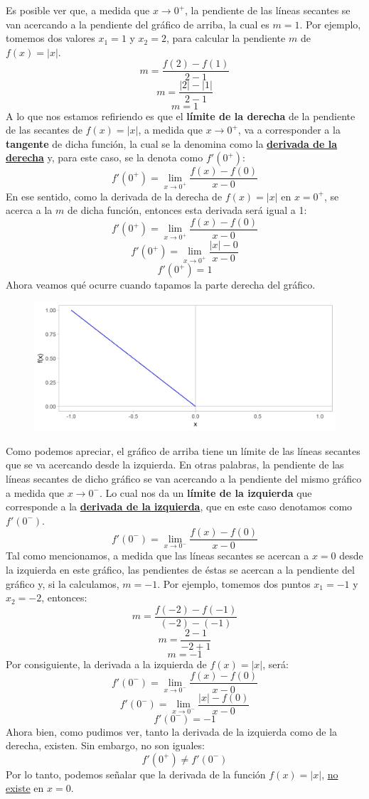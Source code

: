\documentclass[12pt]{article}
\begin{document}
Es posible ver que, a medida que $x \to 0^{+}$, la pendiente de las líneas secantes se van acercando a la pendiente del gráfico de arriba, la cual es $m = 1$. Por ejemplo, tomemos dos valores $x_{1} = 1$ y $x_{2} = 2$, para calcular la pendiente $m$ de $f(x) = |x|$.
\[m = \frac{f(2)-f(1)}{2-1}\]
\[m = \frac{|2|-|1|}{2-1}\]
\[m = 1\]
A lo que nos estamos refiriendo es que el \textbf{límite de la derecha} de la pendiente de las secantes de $f(x) = |x|$, a medida que $x \to 0^{+}$, va a corresponder a la \textbf{tangente} de dicha función, la cual se la denomina como la \textbf{\underline{derivada de la derecha}} y, para este caso, se la denota como $f'(0^{+})$:
\[f'(0^{+}) = \lim_{x \to 0^{+}} \frac{f(x)-f(0)}{x-0}\]
En ese sentido, como la derivada de la derecha de $f(x) = |x|$ en $x = 0^{+}$, se acerca a la $m$ de dicha función, entonces esta derivada será igual a 1:
\[f'(0^{+}) = \lim_{x \to 0^{+}} \frac{f(x)-f(0)}{x-0}\]
\[f'(0^{+}) = \lim_{x \to 0^{+}} \frac{|x|-0}{x-0}\]
\[f'(0^{+}) = 1\]
Ahora veamos qué ocurre cuando tapamos la parte derecha del gráfico.

\begin{figure}[hbt!]
\centering
\includegraphics[scale=0.7]{img/abs_fun_left_plot.jpg}
\end{figure}

Como podemos apreciar, el gráfico de arriba tiene un límite de las líneas secantes que se va acercando desde la izquierda. En otras palabras, la pendiente de las líneas secantes de dicho gráfico se van acercando a la pendiente del mismo gráfico a medida que $x \to 0^{-}$. Lo cual nos da un \textbf{límite de la izquierda} que corresponde a la \textbf{\underline{derivada de la izquierda}}, que en este caso denotamos como $f'(0^{-})$.
\[f'(0^{-}) = \lim_{x \to 0^{-}} \frac{f(x)-f(0)}{x-0}\]
Tal como mencionamos, a medida que las líneas secantes se acercan a $x = 0$ desde la izquierda en este gráfico, las pendientes de éstas se acercan a la pendiente del gráfico y, si la calculamos, $m = -1$. Por ejemplo, tomemos dos puntos $x_{1} = -1$ y $x_{2} = -2$, entonces:
\[m = \frac{f(-2)-f(-1)}{(-2) - (-1)}\]
\[m = \frac{2-1}{-2 + 1}\]
\[m = -1\]
Por consiguiente, la derivada a la izquierda de $f(x) = |x|$, será:
\[f'(0^{-}) = \lim_{x \to 0^{-}} \frac{f(x)-f(0)}{x-0}\]
\[f'(0^{-}) = \lim_{x \to 0^{-}} \frac{|x|-f(0)}{x-0}\]
\[f'(0^{-}) = -1\]
Ahora bien, como pudimos ver, tanto la derivada de la izquierda como de la derecha, existen. Sin embargo, no son iguales:
\[f'(0^{+}) \neq f'(0^{-})\]
Por lo tanto, podemos señalar que la derivada de la función $f(x) = |x|$, \underline{no existe} en $x = 0$.
\end{document}

